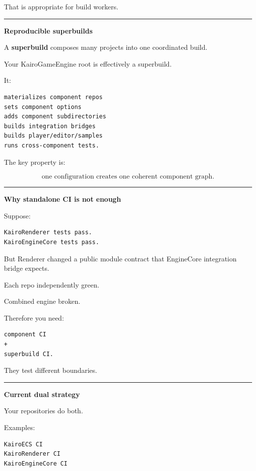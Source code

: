 That is appropriate for build workers.

\begin{center}\rule{0.5\linewidth}{0.5pt}\end{center}

\textbf{Reproducible superbuilds}

A \textbf{superbuild} composes many projects into one coordinated build.

Your KairoGameEngine root is effectively a superbuild.

It:

\begin{verbatim}
materializes component repos
sets component options
adds component subdirectories
builds integration bridges
builds player/editor/samples
runs cross-component tests.
\end{verbatim}

The key property is:

\[
\boxed{
\text{one configuration creates one coherent component graph}.
}
\]

\begin{center}\rule{0.5\linewidth}{0.5pt}\end{center}

\textbf{Why standalone CI is not enough}

Suppose:

\begin{verbatim}
KairoRenderer tests pass.
KairoEngineCore tests pass.
\end{verbatim}

But Renderer changed a public module contract that EngineCore integration bridge expects.

Each repo independently green.

Combined engine broken.

Therefore you need:

\begin{verbatim}
component CI
+
superbuild CI.
\end{verbatim}

They test different boundaries.

\begin{center}\rule{0.5\linewidth}{0.5pt}\end{center}

\textbf{Current dual strategy}

Your repositories do both.

Examples:

\begin{verbatim}
KairoECS CI
KairoRenderer CI
KairoEngineCore CI
\end{verbatim}

